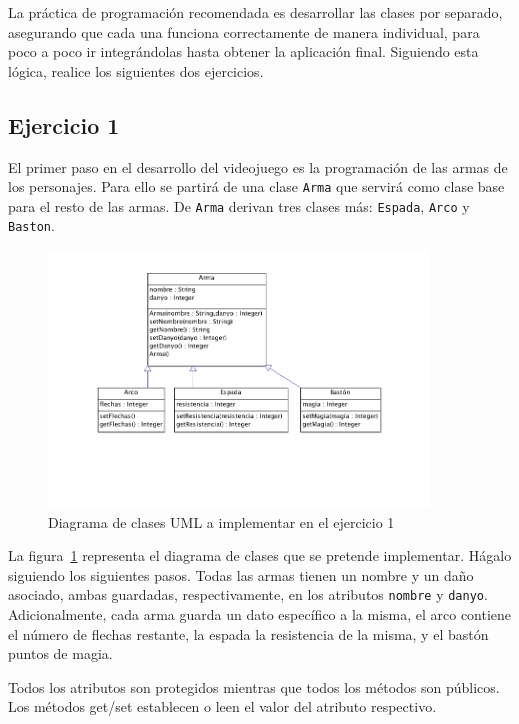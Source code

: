 \documentclass[english,a4paper,11pt]{article}
\begin{document}
La práctica de programación recomendada es desarrollar las clases por separado, asegurando que cada una funciona correctamente de manera individual, para poco a poco ir integrándolas hasta obtener la aplicación final. Siguiendo esta lógica, realice los siguientes dos ejercicios.

\subsection*{Ejercicio 1}
El primer paso en el desarrollo del videojuego es la programación de las armas de los personajes. Para ello se partirá de una clase \texttt{Arma} que servirá como clase base para el resto de las armas. De \texttt{Arma} derivan tres clases más: \texttt{Espada}, \texttt{Arco} y \texttt{Baston}. 

\begin{figure}
  \centering
  \includegraphics[width=0.9\textwidth]{figs/ej1}
  \caption{Diagrama de clases UML a implementar en el ejercicio 1}
  \label{fig:ej1}
\end{figure}

La figura~\ref{fig:ej1} representa el diagrama de clases que se pretende implementar. Hágalo siguiendo los siguientes pasos. Todas las armas tienen un nombre y un daño asociado, ambas guardadas, respectivamente, en los atributos \texttt{nombre} y \texttt{danyo}. Adicionalmente, cada arma guarda un dato específico a la misma, el arco contiene el número de flechas restante, la espada la resistencia de la misma, y el bastón puntos de magia.

Todos los atributos son protegidos mientras que todos los métodos son públicos. Los métodos get/set establecen o leen el valor del atributo respectivo.
\end{document}
